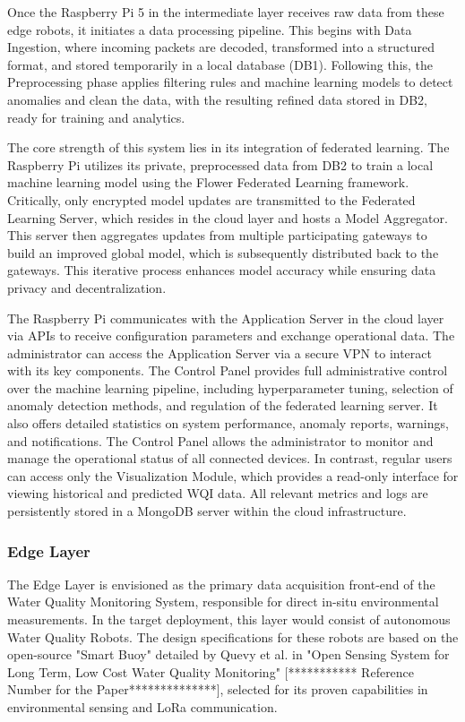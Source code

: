 Once the Raspberry Pi 5 in the intermediate layer receives raw data from these edge robots, it initiates a data processing pipeline. This begins with Data Ingestion, where incoming packets are decoded, transformed into a structured format, and stored temporarily in a local database (DB1). Following this, the Preprocessing phase applies filtering rules and machine learning models to detect anomalies and clean the data, with the resulting refined data stored in DB2, ready for training and analytics.

The core strength of this system lies in its integration of federated learning. The Raspberry Pi utilizes its private, preprocessed data from DB2 to train a local machine learning model using the Flower Federated Learning framework. Critically, only encrypted model updates are transmitted to the Federated Learning Server, which resides in the cloud layer and hosts a Model Aggregator. This server then aggregates updates from multiple participating gateways to build an improved global model, which is subsequently distributed back to the gateways. This iterative process enhances model accuracy while ensuring data privacy and decentralization.

The Raspberry Pi communicates with the Application Server in the cloud layer via APIs to receive configuration parameters and exchange operational data. The administrator can access the Application Server via a secure VPN to interact with its key components. The Control Panel provides full administrative control over the machine learning pipeline, including hyperparameter tuning, selection of anomaly detection methods, and regulation of the federated learning server. It also offers detailed statistics on system performance, anomaly reports, warnings, and notifications. The Control Panel allows the administrator to monitor and manage the operational status of all connected devices. In contrast, regular users can access only the Visualization Module, which provides a read-only interface for viewing historical and predicted WQI data. All relevant metrics and logs are persistently stored in a MongoDB server within the cloud infrastructure.

\subsubsection{Edge Layer}
\label{sssec:edge_layer_detail} %
The Edge Layer is envisioned as the primary data acquisition front-end of the Water Quality Monitoring System, responsible for direct in-situ environmental measurements. In the target deployment, this layer would consist of autonomous Water Quality Robots. The design specifications for these robots are based on the open-source "Smart Buoy" detailed by Quevy et al. in "Open Sensing System for Long Term, Low Cost Water Quality Monitoring" [*********** Reference Number for the Paper**************], selected for its proven capabilities in environmental sensing and LoRa communication.

